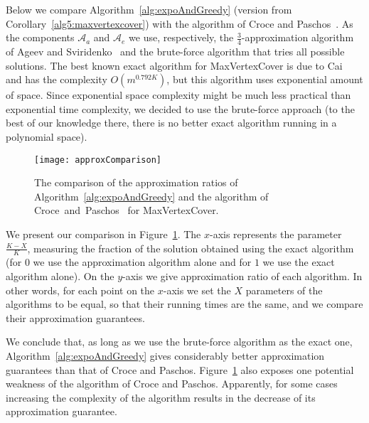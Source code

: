 \documentclass[11pt]{article}
\newcommand{\calA}{{{\mathcal{A}}}}
\begin{document}
Below we compare Algorithm~\ref{alg:expoAndGreedy} (version from
Corollary~\ref{alg5:maxvertexcover}) with the algorithm of Croce and
Paschos~\cite{cro-pas:j:cover}. As the components $\calA_a$ and
$\calA_e$ we use, respectively, the $\frac{3}{4}$-approximation
algorithm of Ageev and Sviridenko~\cite{age-svi:b:covers} and the
brute-force algorithm that tries all possible solutions.  The best
known exact algorithm for MaxVertexCover is due to
Cai~\cite{cai:j:cardinality-constrained} and has the complexity
$O(m^{0.792K})$, but this algorithm uses exponential amount of space.
Since exponential space complexity might be much less practical than
exponential time complexity, we decided to use the brute-force
approach (to the best of our knowledge there, there is no better exact
algorithm running in a polynomial space).
\begin{figure}[tb]
  \begin{center}
    \texttt{[image: approxComparison]}
  \end{center}
  \vspace{-0.75cm}
  \caption{The comparison of the approximation ratios of Algorithm~\ref{alg:expoAndGreedy} and the algorithm of Croce~and~Paschos~\cite{cro-pas:j:cover} for MaxVertexCover.}
  \label{fig:approximationComparison}
\end{figure}
We present our comparison in Figure~\ref{fig:approximationComparison}.
The $x$-axis represents the parameter $\frac{K-X}{K}$, measuring the
fraction of the solution obtained using the exact algorithm (for $0$
we use the approximation algorithm alone and for $1$ we use the exact
algorithm alone). On the $y$-axis we give approximation ratio of each
algorithm.  In other words, for each point on the $x$-axis we set the
$X$ parameters of the algorithms to be equal, so that their running
times are the same, and we compare their approximation guarantees.

We conclude that, as long as we use the brute-force algorithm as the
exact one, Algorithm~\ref{alg:expoAndGreedy} gives considerably better
approximation guarantees than that of Croce and
Paschos. Figure~\ref{fig:approximationComparison} also exposes one
potential weakness of the algorithm of Croce and Paschos. Apparently,
for some cases increasing the complexity of the algorithm results in
the decrease of its approximation guarantee.
\end{document}
